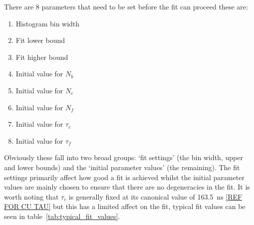 \documentclass[]{article}
\begin{document}
There are 8 parameters that need to be set before the fit can proceed these are:
\begin{enumerate}
    \item Histogram bin width
    \item Fit lower bound
    \item Fit higher bound
    \item Initial value for $N_{b}$
    \item Initial value for $N_{c}$
    \item Initial value for $N_{f}$
    \item Initial value for $\tau_{c}$
    \item Initial value for $\tau_{f}$
\end{enumerate}
Obviously these fall into two broad groups: `fit settings' (the bin width, upper and lower bounds) and the `initial parameter values' (the remaining). The fit settings primarily affect how good a fit is achieved whilst the initial parameter values are mainly chosen to ensure that there are no degeneracies in the fit. It is worth noting that $\tau_{c}$ is generally fixed at its canonical value of 163.5~ns \ref{REF FOR CU TAU} but this has a limited affect on the fit, typical fit values can be seen in table~\ref{tab:typical_fit_values}.
\end{document}

